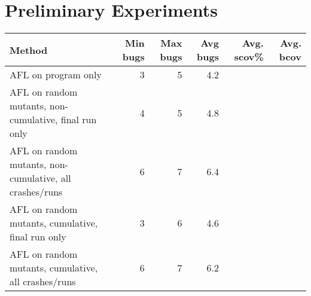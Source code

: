 \section{Preliminary Experiments}

\begin{table*}
\begin{tabular}{l|r|r|r|r|r}
  Method & Min bugs & Max bugs & Avg bugs & Avg. scov\% & Avg. bcov \\
  \hline
  AFL on program only & 3 & 5 & 4.2 \\
  \hline
  AFL on random mutants, non-cumulative, final run only & 4 & 5 & 4.8 \\
  AFL on random mutants, non-cumulative, all crashes/runs & 6 & 7 & 6.4 \\
  \hline
  AFL on random mutants, cumulative, final run only & 3 & 6 & 4.6 \\
  AFL on random mutants, cumulative, all crashes/runs & 6 & 7 & 6.2\\
  \hline
\end{tabular}
\end{table*}
